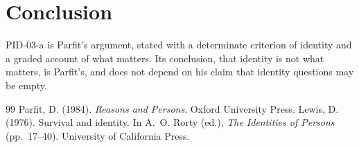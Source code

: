 \documentclass{situationist-preprint}
\begin{document}
\section{Conclusion}

PID-03-a is Parfit's argument, stated with a determinate criterion of identity and a graded account of what matters. Its conclusion, that identity is not what matters, is Parfit's, and does not depend on his claim that identity questions may be empty.

\begin{thebibliography}{99}\small
{} Parfit, D. (1984). \emph{Reasons and Persons}. Oxford University Press.
 Lewis, D. (1976). Survival and identity. In A.~O. Rorty (ed.), \emph{The Identities of Persons} (pp.~17--40). University of California Press.
\end{thebibliography}
\end{document}
